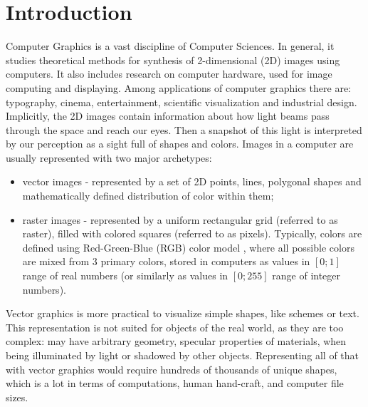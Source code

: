 \chapter{Introduction}

Computer Graphics is a vast discipline of Computer Sciences. In general, it studies theoretical methods for synthesis of 2-dimensional (2D) images using computers. It also includes research on computer hardware, used for image computing and displaying. Among applications of computer graphics there are: typography, cinema, entertainment, scientific visualization and industrial design. Implicitly, the 2D images contain information about how light beams pass through the space and reach our eyes. Then a snapshot of this light is interpreted by our perception as a sight full of shapes and colors. Images in a computer are usually represented with two major archetypes:

\begin{itemize}
	\item vector images \cite{aux:vector14} - represented by a set of 2D points, lines, polygonal shapes and mathematically defined distribution of color within them;
	\item raster images \cite{aux:raster94} - represented by a uniform rectangular grid (referred to as raster), filled with colored squares (referred to as pixels). Typically, colors are defined using Red-Green-Blue (RGB) color model \cite{aux:color05}, where all possible colors are mixed from 3 primary colors, stored in computers as values in $[0;1]$ range of real numbers (or similarly as values in $[0;255]$ range of integer numbers).
\end{itemize}

Vector graphics is more practical to visualize simple shapes, like schemes or text. This representation is not suited for objects of the real world, as they are too complex: may have arbitrary geometry, specular properties of materials, when being illuminated by light or shadowed by other objects. Representing all of that with vector graphics would require hundreds of thousands of unique shapes, which is a lot in terms of computations, human hand-craft, and computer file sizes. 

